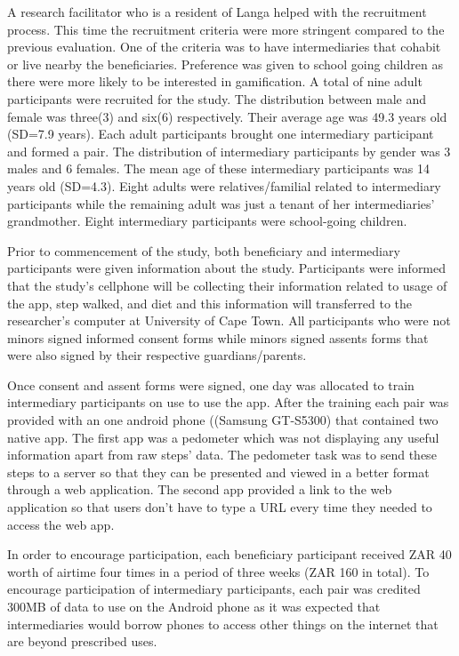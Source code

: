 A research facilitator who is a resident of Langa helped with the recruitment process. This time the recruitment criteria were more stringent compared to the previous evaluation. One of the criteria was to have intermediaries that cohabit or live nearby the beneficiaries. Preference was given to school going children as there were more likely to be interested in gamification. A total of nine adult participants were recruited for the study. The distribution between male and female was three(3) and six(6) respectively. Their average age was 49.3 years old (SD=7.9 years). Each adult participants brought one intermediary participant and formed a pair. The distribution of intermediary participants by gender was 3 males and 6 females. The mean age of these intermediary participants was 14 years old (SD=4.3).  Eight adults  were relatives/familial related to intermediary participants while the remaining adult was just a tenant of her intermediaries' grandmother. Eight intermediary participants were school-going children.

Prior to commencement of the study, both beneficiary and intermediary participants were given information about the study. Participants were informed that the study's cellphone will be collecting their information related to usage of the app, step walked,  and diet and this information will transferred to the researcher's computer at University of Cape Town. All participants who were not minors signed informed consent forms while minors signed assents forms that were also signed by their respective guardians/parents.

Once consent and assent forms were signed, one day was allocated to train intermediary participants on use to use the app. After the training each pair was provided with an one android phone ((Samsung
GT-S5300) that contained two native app. The first app was a pedometer which was not displaying any useful information apart from raw steps' data. The pedometer task was to send these steps to a server so that they can be presented  and viewed in a better format through a web application. The second app provided a link to the web application so that users don't have to type a URL every time they needed to access the web app.

In order to encourage participation, each beneficiary participant received ZAR 40 worth of airtime four times in a period of three weeks (ZAR 160 in total). To encourage participation of intermediary participants, each pair was credited 300MB of data to use on the Android phone as it was expected that intermediaries would borrow phones to access other things on the internet that are beyond prescribed uses.

